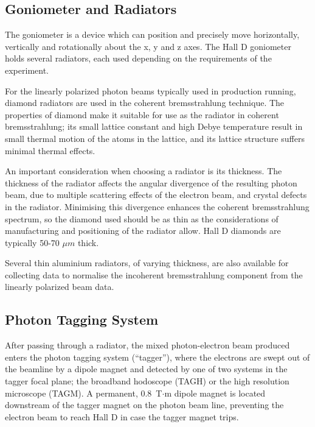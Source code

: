 \subsection{Goniometer and Radiators \label{sec:radiators}}
The goniometer is a device which can position and precisely move horizontally, vertically and rotationally about the x, y and z axes.
The Hall D goniometer holds several radiators, each used depending on the requirements of the experiment.

For the linearly polarized photon beams typically used in \GX{} production running, diamond radiators are used in the coherent bremsstrahlung technique.
The properties of diamond make it suitable for use as the radiator in coherent bremsstrahlung; its small lattice constant and high Debye temperature result in small thermal motion of the atoms in the lattice, and its lattice structure suffers minimal thermal effects.

An important consideration when choosing a radiator is its thickness. The thickness of the radiator affects the angular divergence of the resulting photon beam, due to multiple scattering effects of the electron beam, and crystal defects in the radiator.
Minimising this divergence enhances the coherent bremsstrahlung spectrum, so the diamond used should be as thin as the considerations of manufacturing and
positioning of the radiator allow.
Hall D diamonds are typically 50-70 $\mu m$ thick.



Several thin aluminium radiators, of varying thickness, are also available for collecting data to normalise the incoherent bremsstrahlung component from the linearly polarized beam data.

\subsection{Photon Tagging System \label{sec:tag}}
After passing through a radiator, the mixed photon-electron beam produced enters the photon tagging system (``tagger''), where the electrons are swept out of the beamline by a dipole magnet and detected by one of two systems in the tagger focal plane; the broadband hodoscope (TAGH) or the high resolution microscope (TAGM).
A permanent, 0.8~T$\cdot$m dipole magnet is located
downstream of the tagger magnet on the photon beam line, preventing
the electron beam to reach Hall D in case the tagger magnet trips.

